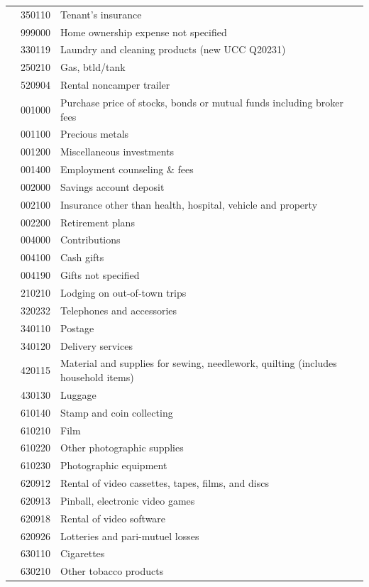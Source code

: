 \documentclass[
]{agujournal2019}
\begin{document}
\begin{table}
{\begin{tabular*}{\linewidth}{@{\extracolsep{\fill}}l|rl}
 & 350110 & Tenant's insurance \\ 
 & 999000 & Home ownership expense not specified \\ 
 & 330119 & Laundry and cleaning products (new UCC Q20231) \\ 
 & 250210 & Gas, btld/tank \\ 
\midrule\addlinespace[2.5pt]
\multirow[t]{38}{*}{Other} & 520904 & Rental noncamper trailer \\ 
 & 001000 & Purchase price of stocks, bonds or mutual funds including broker fees \\ 
 & 001100 & Precious metals \\ 
 & 001200 & Miscellaneous investments \\ 
 & 001400 & Employment counseling \& fees \\ 
 & 002000 & Savings account deposit \\ 
 & 002100 & Insurance other than health, hospital, vehicle and property \\ 
 & 002200 & Retirement plans \\ 
 & 004000 & Contributions \\ 
 & 004100 & Cash gifts \\ 
 & 004190 & Gifts not specified \\ 
 & 210210 & Lodging on out-of-town trips \\ 
 & 320232 & Telephones and accessories \\ 
 & 340110 & Postage \\ 
 & 340120 & Delivery services \\ 
 & 420115 & Material and supplies for sewing, needlework, quilting (includes household items) \\ 
 & 430130 & Luggage \\ 
 & 610140 & Stamp and coin collecting \\ 
 & 610210 & Film \\ 
 & 610220 & Other photographic supplies \\ 
 & 610230 & Photographic equipment \\ 
 & 620912 & Rental of video cassettes, tapes, films, and discs \\ 
 & 620913 & Pinball, electronic video games \\ 
 & 620918 & Rental of video software \\ 
 & 620926 & Lotteries and pari-mutuel losses \\ 
 & 630110 & Cigarettes \\ 
 & 630210 & Other tobacco products \\ 

\end{tabular*}}
\end{table}
\end{document}
